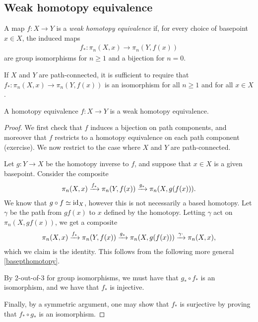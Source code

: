 \documentclass{article}[11pt]
\begin{document}
\subsection{Weak homotopy equivalence}

\begin{definition} A map $f: X\to Y$ is a \textit{weak homotopy equivalence} if, for every choice of basepoint $x \in X$, the induced maps
\begin{align*}
	f_\ast : \pi_n(X,x) \to \pi_n(Y,f(x))
\end{align*}
are group isomorphisms for $n\geq 1$ and a bijection for $n=0$.
\end{definition}

\begin{note} If $X$ and $Y$ are path-connected, it is sufficient to require that $f_\ast : \pi_n(X,x) \to \pi_n(Y,f(x))$ is an isomorphism for all $n\geq 1$ and for all $x\in X$.
\end{note}

\begin{proposition}\label{htpyequivisweak} A homotopy equivalence $f: X\to Y$ is a weak homotopy equivalence.
\end{proposition}
\begin{proof} We first check that $f$ induces a bijection on path components, and moreover that $f$ restricts to a homotopy equivalence on each path component (exercise). We now restrict to the case where $X$ and $Y$ are path-connected.

Let $g: Y \to X$ be the homotopy inverse to $f$, and suppose that $x\in X$ is a given basepoint. Consider the composite
\begin{align*}
	\pi_n(X,x) \xrightarrow{f_\ast} \pi_n(Y,f(x)) \xrightarrow{g_\ast} \pi_n(X, g(f(x))).
\end{align*}
We know that $g\circ f \simeq \text{id}_X$, however this is not necessarily a based homotopy. Let $\gamma$ be the path from $gf(x)$ to $x$ defined by the homotopy. Letting $\gamma$ act on $\pi_n(X,gf(x))$, we get a composite
\begin{align*}
	\pi_n(X,x) \xrightarrow{f_\ast} \pi_n(Y,f(x)) \xrightarrow{g_\ast} \pi_n(X, g(f(x))) \xrightarrow{\gamma\cdot} \pi_n(X,x),
\end{align*}
which we claim is the identity. This follows from the following more general \autoref{basepthomotopy}.

By 2-out-of-3 for group isomorphisms, we must have that $g_\ast \circ f_\ast$ is an isomorphism, and we have that $f_\ast$ is injective.

Finally, by a symmetric argument, one may show that $f_\ast$ is surjective by proving that $f_\ast \circ g_\ast$ is an isomorphism.
\end{proof}
\end{document}
